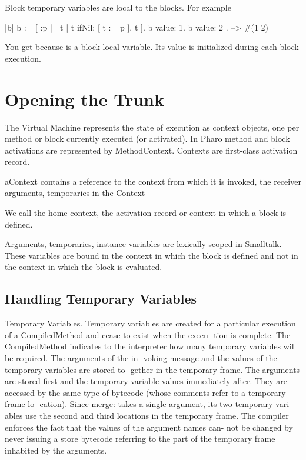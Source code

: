 \documentclass[a4paper,10pt,twoside]{book}
\begin{document}
Block temporary variables are local to the blocks. For example


\begin{code}{}
|b|
b := [ :p |
	| t |
	t ifNil: [ t := p ].
	t ].
{ b value: 1. b value: 2 }.
   -->  #(1 2)
\end{code}

You get  because  is a block local variable. Its value is initialized during each block execution.




\section{Opening the Trunk}

The Virtual Machine represents the state of execution as context objects, one per method or block currently executed (or activated). In Pharo method and block activations are represented by MethodContext.
Contexts are first-class activation record.

aContext contains a reference to the context from which it is invoked, the receiver arguments, temporaries in the Context

We call the home context, the activation record or context in which a block is defined.

Arguments, temporaries, instance variables are lexically scoped in Smalltalk. These variables are bound in the context in which the block is defined and not in the context in which the block is evaluated.

\subsection{Handling Temporary Variables}
Temporary Variables.
 Temporary variables are created for a particular execution of a CompiledMethod and cease to exist when the execu- tion is complete. The CompiledMethod indicates to the interpreter how many temporary variables will be required. The arguments of the in- voking message and the values of the temporary variables are stored to- gether in the temporary frame. The arguments are stored first and the temporary variable values immediately after. They are accessed by the same type of bytecode (whose comments refer to a temporary frame lo- cation). Since merge: takes a single argument, its two temporary vari- ables use the second and third locations in the temporary frame. The compiler enforces the fact that the values of the argument names can- not be changed by never issuing a store bytecode referring to the part of the temporary frame inhabited by the arguments.
\end{document}
